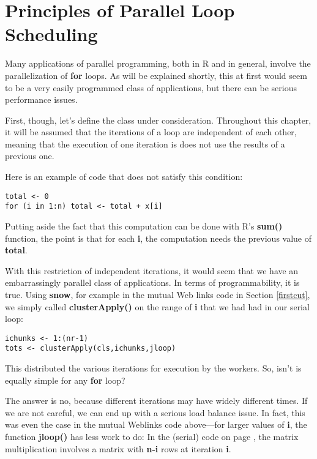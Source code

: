 \chapter{Principles of Parallel Loop Scheduling} 
\label{chap:loopsprinciples}  

Many applications of parallel programming, both in R and in general,
involve the parallelization of {\bf for} loops.  As will be explained
shortly, this at first would seem to be a very easily programmed class
of applications, but there can be serious performance issues.

First, though, let's define the class under consideration.  Throughout
this chapter, it will be assumed that the iterations of a loop are
independent of each other, meaning that the execution of one iteration
is does not use the results of a previous one.  

Here is an example of code that does not satisfy this condition:

\begin{lstlisting}
total <- 0
for (i in 1:n) total <- total + x[i]
\end{lstlisting}

Putting aside the fact that this computation can be done with R's {\bf
sum()} function, the point is that for each {\bf i}, the computation
needs the previous value of {\bf total}.

With this restriction of independent iterations, it would seem that we
have an embarrassingly parallel class of applications.  In terms of
programmability, it is true.  Using {\bf snow}, for example in the
mutual Web links code in Section \ref{firstcut}, we simply called {\bf
clusterApply()} on the range of {\bf i} that we had had in our serial
loop:  

\begin{lstlisting}
ichunks <- 1:(nr-1)
tots <- clusterApply(cls,ichunks,jloop)
\end{lstlisting}

This distributed the various iterations for execution by the workers.
So, isn't is equally simple for any {\bf for} loop?

The answer is no, because different iterations may have widely different
times.  If we are not careful, we can end up with a serious load
balance issue.  In fact, this was even the case in the mutual Weblinks
code above---for larger values of {\bf i}, the function {\bf jloop()} 
has less work to do:  In the (serial) code on page \pageref{matrixform},
the matrix multiplication involves a matrix with {\bf n-i} rows at
iteration {\bf i}.

